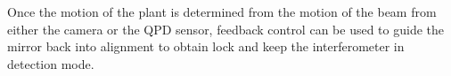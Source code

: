 \documentclass[colorlinks=true,pdfstartview=FitV,linkcolor=blue,
            citecolor=red,urlcolor=magenta]{ligodoc}
\newcommand{\G}[1]{\textcolor{JungleGreen}{#1}} %
\begin{document}
    Once the motion of the plant is determined from the motion of the beam from either the camera or the QPD sensor, feedback control can be used to guide the mirror back into alignment to obtain lock and keep the interferometer in detection mode.
     

    



\end{document}

